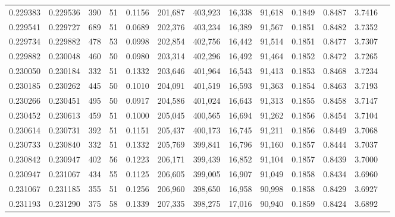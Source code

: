 \begin{tabular}{rrrrrrrrrrrrr}
0.229383 & 0.229536 &   390 &  51 &                                     0.1156 & 201,687 & 403,923 &  16,338 &  91,618 & 0.1849 & 0.8487 & 3.7416 \\
0.229541 & 0.229727 &   689 &  51 &                                     0.0689 & 202,376 & 403,234 &  16,389 &  91,567 & 0.1851 & 0.8482 & 3.7352 \\
0.229734 & 0.229882 &   478 &  53 &                                     0.0998 & 202,854 & 402,756 &  16,442 &  91,514 & 0.1851 & 0.8477 & 3.7307 \\
0.229882 & 0.230048 &   460 &  50 &                                     0.0980 & 203,314 & 402,296 &  16,492 &  91,464 & 0.1852 & 0.8472 & 3.7265 \\
0.230050 & 0.230184 &   332 &  51 &                                     0.1332 & 203,646 & 401,964 &  16,543 &  91,413 & 0.1853 & 0.8468 & 3.7234 \\
0.230185 & 0.230262 &   445 &  50 &                                     0.1010 & 204,091 & 401,519 &  16,593 &  91,363 & 0.1854 & 0.8463 & 3.7193 \\
0.230266 & 0.230451 &   495 &  50 &                                     0.0917 & 204,586 & 401,024 &  16,643 &  91,313 & 0.1855 & 0.8458 & 3.7147 \\
0.230452 & 0.230613 &   459 &  51 &                                     0.1000 & 205,045 & 400,565 &  16,694 &  91,262 & 0.1856 & 0.8454 & 3.7104 \\
0.230614 & 0.230731 &   392 &  51 &                                     0.1151 & 205,437 & 400,173 &  16,745 &  91,211 & 0.1856 & 0.8449 & 3.7068 \\
0.230733 & 0.230840 &   332 &  51 &                                     0.1332 & 205,769 & 399,841 &  16,796 &  91,160 & 0.1857 & 0.8444 & 3.7037 \\
0.230842 & 0.230947 &   402 &  56 &                                     0.1223 & 206,171 & 399,439 &  16,852 &  91,104 & 0.1857 & 0.8439 & 3.7000 \\
0.230947 & 0.231067 &   434 &  55 &                                     0.1125 & 206,605 & 399,005 &  16,907 &  91,049 & 0.1858 & 0.8434 & 3.6960 \\
0.231067 & 0.231185 &   355 &  51 &                                     0.1256 & 206,960 & 398,650 &  16,958 &  90,998 & 0.1858 & 0.8429 & 3.6927 \\
0.231193 & 0.231290 &   375 &  58 &                                     0.1339 & 207,335 & 398,275 &  17,016 &  90,940 & 0.1859 & 0.8424 & 3.6892 \\

\end{tabular}
